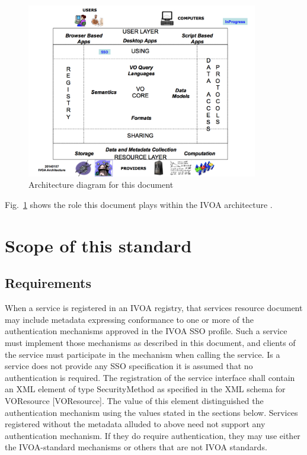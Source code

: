 \documentclass[11pt,a4paper]{ivoa}
\begin{document}
\begin{figure}
\centering

\includegraphics[width=0.9\textwidth]{SSO_image001.png}
\caption{Architecture diagram for this document}
\label{fig:archdiag}
\end{figure}

Fig.~\ref{fig:archdiag} shows the role this document plays within the
IVOA architecture \citep{note:VOARCH}.


\section{Scope of this standard}
\subsection{Requirements}
When a service is registered in an IVOA registry, that services resource document may include metadata expressing conformance to one or more of the authentication mechanisms approved in the IVOA SSO profile. Such a service must implement those mechanisms as described in this document, and clients of the service must participate in the mechanism when calling the service. Is a service does not provide any SSO specification it is assumed that no authentication is required.
The registration of the service interface shall contain an XML element of type {\xmlel SecurityMethod} as specified in the XML schema for VOResource [VOResource]. The value of this element distinguished the authentication mechanism using the values stated in the sections below.
Services registered without the metadata alluded to above need not support any authentication mechanism. If they do require authentication, they may use either the IVOA-standard mechanisms or others that are not IVOA standards.
\end{document}
